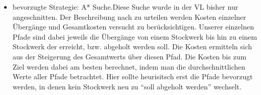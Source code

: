 \documentclass[ngerman]{fbi-aufgabenblatt}
\begin{document}
\begin{itemize}
    \item bevorzugte Strategie: A* Suche.Diese Suche wurde in der VL bisher nur angeschnitten. Der Beschreibung nach zu urteilen werden Kosten einzelner Übergänge und Gesamtkosten versucht zu berücksichtigen. Unserer einzelnen Pfade sind dabei jeweils die Übergänge von einem Stockwerk bis hin zu einem Stockwerk der erreicht, bzw. abgeholt werden soll. Die Kosten ermitteln sich aus der Steigerung des Gesamtwerts über diesen Pfad. Die Kosten bis zum Ziel werden dabei am besten berechnet, indem man die durchschnittlichen Werte aller Pfade betrachtet. Hier sollte heurisitsch erst die Pfade bevorzugt werden, in denen kein Stockwerk neu zu “soll abgeholt werden” wechselt. 

\end{itemize}
\end{document}
